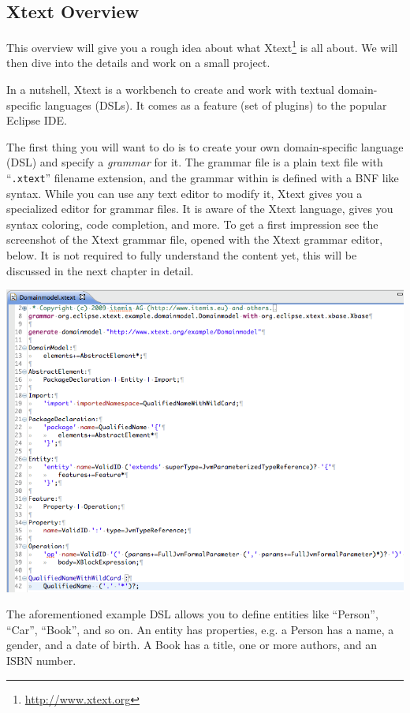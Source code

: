 \subsection{Xtext Overview}

This overview will give you a rough idea about what
Xtext\footnote{\url{http://www.xtext.org}} is all about. We will then dive into
the details and work on a small project.

In a nutshell, Xtext is a workbench to create and work with textual
domain-specific languages (DSLs). It comes as a feature (set of plugins) to the
popular Eclipse IDE.

The first thing you will want to do is to create your own domain-specific
language (DSL) and specify a \emph{grammar} for it. The grammar file is a plain
text file with ``\texttt{.xtext}'' filename extension, and the grammar within is
defined with a BNF like syntax. While you can use any text editor to modify it,
Xtext gives you a specialized editor for grammar files. It is aware of the Xtext
language, gives you syntax coloring, code completion, and more. To get a first
impression see the screenshot of the Xtext grammar file, opened with the Xtext
grammar editor, below. It is not required to fully understand the content yet,
this will be discussed in the next chapter in detail.

\includegraphics[width=16cm]{images/intro/overview-xtext-grammar.png}

The aforementioned example DSL allows you to define entities like ``Person'',
``Car'', ``Book'', and so on.
An entity has properties, e.g. a
Person has a name, a gender, and a date of birth. A Book has a title, one or
more authors, and an ISBN number.

